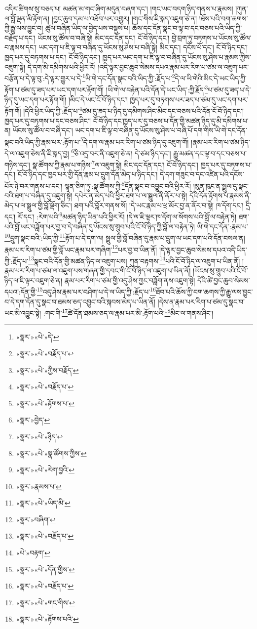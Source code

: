 འདིར་ཚིགས་སུ་བཅད་པ། མཚན་མ་གང་ཞིག་མདུན་བཞག་དང་། །གང་ཡང་བདག་ཉིད་གནས་པ་རྣམས། །ཀུན་ལ་བློ་ལྡན་མི་རྟོག་ན། །བྱང་ཆུབ་དམ་པ་འཐོབ་པར་འགྱུར། །གང་གིས་ཇི་སྐད་འཇུག་ཅེ་ན། །ཐོས་པའི་བག་ཆགས་ཀྱི་རྒྱུ་ལས་བྱུང་བ། ཚུལ་བཞིན་ཡིད་ལ་བྱེད་པས་བསྡུས་པ། ཆོས་དང་དོན་སྣང་བ་ལྟ་བ་དང་བཅས་པའི་ཡིད་ཀྱི་བརྗོད་པ་དང་། ཡོངས་སུ་ཚོལ་བ་བཞི་སྟེ། མིང་དང་དོན་དང་། ངོ་བོ་ཉིད་དང་། བྱེ་བྲག་ཏུ་བཏགས་པ་ཡོངས་སུ་ཚོལ་བ་རྣམས་དང་། ཡང་དག་པ་ཇི་ལྟ་བ་བཞིན་དུ་ཡོངས་སུ་ཤེས་པ་བཞི་སྟེ། མིང་དང་། དངོས་པོ་དང་། ངོ་བོ་ཉིད་དང་། ཁྱད་པར་དུ་བཏགས་པ་དང་། ངོ་བོ་ཉིད་དང་། ཁྱད་པར་ཡང་དག་པ་ཇི་ལྟ་བ་བཞིན་དུ་ཡོངས་སུ་ཤེས་པ་རྣམས་ཀྱིས་འཇུག་སྟེ། དེ་དག་མི་དམིགས་པའི་ཕྱིར་རོ། །འདི་ལྟར་བྱང་ཆུབ་སེམས་དཔའ་རྣམ་པར་རིག་པ་ཙམ་ལ་འཇུག་པར་བརྩོན་པ་དེ་ལྟ་བུ་:དེ་ལྟར་གྱུར་པ་དེ་\footnote{«སྣར་»«པེ་»དེ་}ཡི་གེ་དང་དོན་སྣང་བའི་ཡིད་ཀྱི་:རྗོད་པ་\footnote{«སྣར་»«པེ་»བརྗོད་པ་}དེ་ལ་ཡི་གེའི་མིང་དེ་ཡང་ཡིད་ཀྱི་རྟོག་པ་ཙམ་དུ་ཟད་པར་ཡང་དག་པར་རྟོག་གོ། །ཡི་གེ་ལ་བརྟེན་པའི་དོན་དེ་ཡང་ཡིད་:ཀྱི་རྗོད་\footnote{«སྣར་»«པེ་»ཀྱིས་བརྗོད་}པ་ཙམ་དུ་ཟད་པ་དེ་ཉིད་དུ་ཡང་དག་པར་རྟོག་གོ། །མིང་དེ་ཡང་ངོ་བོ་ཉིད་དང་། ཁྱད་པར་དུ་བཏགས་པར་ཟད་པ་ཙམ་དུ་ཡང་དག་པར་རྟོག་གོ། །དེའི་ཕྱིར་ཡིད་ཀྱི་:རྗོད་པ་\footnote{«སྣར་»«པེ་»བརྗོད་པ་}ཙམ་དུ་ཟད་པ་ཉིད་དུ་དམིགས་ཤིང་མིང་དང་བཅས་པའི་དོན་ངོ་བོ་ཉིད་དང་། ཁྱད་པར་དུ་བཏགས་པ་དང་བཅས་ཤིང་། ངོ་བོ་ཉིད་དང་ཁྱད་པར་དུ་བཅས་པ་དོན་གྱི་མཚན་ཉིད་དུ་མི་དམིགས་པ་ན། ཡོངས་སུ་ཚོལ་བ་བཞི་དང་། ཡང་དག་པ་ཇི་ལྟ་བ་བཞིན་དུ་ཡོངས་སུ་ཤེས་པ་བཞི་པོ་དག་གིས་ཡི་གེ་དང་དོན་སྣང་བའི་ཡིད་ཀྱི་རྣམ་པར་:རྟོག་པ་\footnote{«སྣར་»«པེ་»རྟོགས་པ་}དེ་དག་ལ་རྣམ་པར་རིག་པ་ཙམ་ཉིད་དུ་འཇུག་གོ། །རྣམ་པར་རིག་པ་ཙམ་ཉིད་དེ་ལ་འཇུག་ཅེས་ནི་ཇི་སྐད་བྱ། \footnote{«སྣར་»བྱེད་}ཅི་འདྲ་བར་ནི་འཇུག་ཅེ་ན། དེ་ཙམ་ཉིད་དང་། རྒྱུ་མཚན་དང་ལྟ་བ་དང་བཅས་པ་གཉིས་དང་། སྣ་ཚོགས་ཀྱི་རྣམ་པ་གཉིས་\footnote{«སྣར་»«པེ་»ཉིད་}ལ་འཇུག་སྟེ། མིང་དང་དོན་དང་། ངོ་བོ་ཉིད་དང་། ཁྱད་པར་དུ་བཏགས་པ་དང་། ངོ་བོ་ཉིད་དང་ཁྱད་པར་གྱི་དོན་རྣམ་པ་དྲུག་དོན་མེད་པ་ཉིད་དང་། དེ་དག་གཟུང་བ་དང་འཛིན་པའི་དངོས་པོར་ཉེ་བར་གནས་པ་དང་། ལྷན་ཅིག་ཏུ་:སྣ་ཚོགས་ཀྱི་\footnote{«སྣར་»«པེ་»སྣ་ཚོགས་ཀྱིས་}དོན་སྣང་བ་འབྱུང་བའི་ཕྱིར་རོ། །མུན་ཁུང་ན་སྦྲུལ་དུ་སྣང་བའི་ཐག་པ་བཞིན་དུ་འཇུག་སྟེ། དཔེར་ན་མེད་པའི་ཕྱིར་ཐག་པ་ལ་སྦྲུལ་ནི་ནོར་པ་སྟེ། དེའི་དོན་རྟོགས་པ་རྣམས་ནི་མེད་པ་ལ་སྦྲུལ་གྱི་བློ་ལྡོག་ཅིང་། ཐག་པའི་བློར་གནས་སོ། །དེ་ཡང་རྣམ་པ་ཕྲ་མོར་བྱ་ན་ནོར་བ་སྟེ། ཁ་དོག་དང་། དྲི་དང་། རོ་དང་། :རེག་པའི་\footnote{«སྣར་»«པེ་»རེག་བྱའི་}མཚན་ཉིད་ཡིན་པའི་ཕྱིར་རོ། །དེ་ལ་ཇི་ལྟར་ཁ་དོག་ལ་སོགས་པའི་བློ་ལ་བརྟེན་ཏེ། ཐག་པའི་བློ་ཡང་བཟློག་པར་བྱ་བ་དེ་བཞིན་དུ་ཡོངས་སུ་གྲུབ་པའི་ངོ་བོ་ཉིད་ཀྱི་བློ་ལ་བརྟེན་ཏེ། ཡི་གེ་དང་དོན་:རྣམ་པ་\footnote{«སྣར་»རྣམས་པ་}དྲུག་སྣང་བའི་:ཡིད་ཀྱི་\footnote{«སྣར་»«པེ་»ཡིད་མི་}རྟོག་པ་དེ་དག་ལ། སྦྲུལ་གྱི་བློ་བཞིན་དུ་རྣམ་པ་དྲུག་ལ་ཡང་དག་པའི་དོན་བསལ་ན། རྣམ་པར་རིག་པ་ཙམ་གྱི་བློ་ཡང་རྣམ་པར་གཞིག་\footnote{«སྣར་»བཞིག་}པར་བྱ་བ་ཡིན་ནོ། །དེ་ལྟར་བྱང་ཆུབ་སེམས་དཔའ་འདི་ཡིད་ཀྱི་:རྗོད་པ་\footnote{«སྣར་»«པེ་»བརྗོད་པ་}སྣང་བའི་དོན་གྱི་མཚན་ཉིད་ལ་འཇུག་པས། ཀུན་བརྟགས་\footnote{«པེ་»བརྟག་}པའི་ངོ་བོ་ཉིད་ལ་འཇུག་པ་ཡིན་ནོ། །རྣམ་པར་རིག་པ་ཙམ་ལ་འཇུག་པས་གཞན་གྱི་དབང་གི་ངོ་བོ་ཉིད་ལ་འཇུག་པ་ཡིན་ནོ། །ཡོངས་སུ་གྲུབ་པའི་ངོ་བོ་ཉིད་ལ་ཇི་ལྟར་འཇུག་ཅེ་ན། རྣམ་པར་རིག་པ་ཙམ་གྱི་འདུ་ཤེས་ཀྱང་བཟློག་ནས་འཇུག་སྟེ། དེའི་ཚེ་བྱང་ཆུབ་སེམས་དཔའ་:དོན་གྱི་\footnote{«སྣར་»«པེ་»དོན་གྱིས་}འདུ་ཤེས་རྣམ་པར་བཤིག་པ་དེ་ལ་ཡིད་ཀྱི་:རྗོད་པ་\footnote{«སྣར་»«པེ་»བརྗོད་པ་}ཐོབ་པའི་ཆོས་ཀྱི་བག་ཆགས་ཀྱི་རྒྱུ་ལས་བྱུང་བ་དེ་དག་དོན་དུ་སྣང་བ་ཐམས་ཅད་འབྱུང་བའི་སྐབས་མེད་པ་ཡིན་ནོ། །དེས་ན་རྣམ་པར་རིག་པ་ཙམ་དུ་སྣང་བ་ཡང་མི་འབྱུང་སྟེ། :གང་གི་\footnote{«སྣར་»«པེ་»གང་གིས་}ཚེ་དོན་ཐམས་ཅད་ལ་རྣམ་པར་མི་:རྟོག་པའི་\footnote{«སྣར་»«པེ་»རྟོགས་པའི་}མིང་ལ་གནས་ཤིང་། 